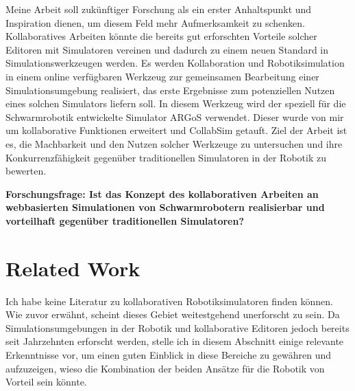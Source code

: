 \documentclass[german,version-2020-11]{uzl-thesis}
\begin{document}

Meine Arbeit soll zukünftiger Forschung als ein erster Anhaltspunkt und Inspiration dienen, um diesem Feld mehr Aufmerksamkeit zu schenken. 
Kollaboratives Arbeiten könnte die bereits gut erforschten Vorteile solcher Editoren mit Simulatoren vereinen und dadurch zu einem neuen Standard in Simulationswerkzeugen werden. 
Es werden Kollaboration und Robotiksimulation in einem online verfügbaren Werkzeug zur gemeinsamen Bearbeitung einer Simulationsumgebung realisiert, 
das erste Ergebnisse zum potenziellen Nutzen eines solchen Simulators liefern soll. 
In diesem Werkzeug wird der speziell für die Schwarmrobotik entwickelte Simulator ARGoS verwendet. 
Dieser wurde von mir um kollaborative Funktionen erweitert und CollabSim getauft. 
Ziel der Arbeit ist es, die Machbarkeit und den Nutzen solcher Werkzeuge zu untersuchen und ihre Konkurrenzfähigkeit gegenüber traditionellen Simulatoren in der Robotik zu bewerten.

\begin{tcolorbox}[colframe=black,colback=white,boxrule=0.5mm,arc=0mm]
  \textbf{Forschungsfrage: Ist das Konzept des kollaborativen Arbeiten an webbasierten Simulationen von Schwarmrobotern realisierbar und vorteilhaft gegenüber traditionellen Simulatoren?}
  \end{tcolorbox}





\section{Related Work}



Ich habe keine Literatur zu kollaborativen Robotiksimulatoren finden können. 
Wie zuvor erwähnt, scheint dieses Gebiet weitestgehend unerforscht zu sein. 
Da Simulationsumgebungen in der Robotik und kollaborative Editoren jedoch bereits seit Jahrzehnten erforscht werden, 
stelle ich in diesem Abschnitt einige relevante Erkenntnisse vor, um einen guten Einblick in diese Bereiche zu gewähren und aufzuzeigen, 
wieso die Kombination der beiden Ansätze für die Robotik von Vorteil sein könnte.
\end{document}
